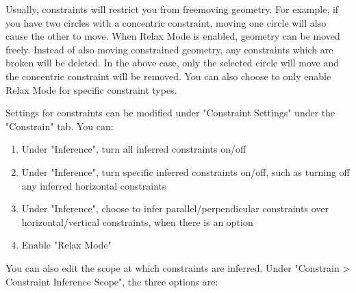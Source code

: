 Usually, constraints will restrict you from freemoving geometry. For example, if you have two circles with a concentric constraint, moving one circle will also cause the other to move. When Relax Mode is enabled, geometry can be moved freely. Instead of also moving constrained geometry, any constraints which are broken will be deleted. In the above case, only the selected circle will move and the concentric constraint will be removed. You can also choose to only enable Relax Mode for specific constraint types.

Settings for constraints can be modified under "Constraint Settings" under the "Constrain" tab. You can:


\begin{enumerate}
    \item Under "Inference", turn all inferred constraints on/off
    \item Under "Inference", turn specific inferred constraints on/off, such as turning off any inferred horizontal constraints
    \item Under "Inference", choose to infer parallel/perpendicular constraints over horizontal/vertical constraints, when there is an option
    \item Enable "Relax Mode"
\end{enumerate}

You can also edit the scope at which constraints are inferred. Under "Constrain > Constraint Inference Scope", the three options are:

